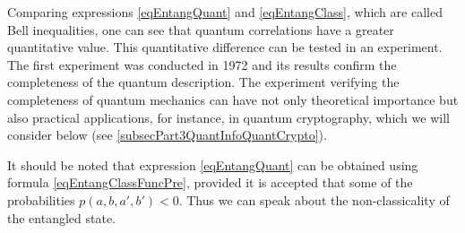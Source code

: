 Comparing expressions \eqref{eqEntangQuant} and \eqref{eqEntangClass},
which are called Bell inequalities,
one can see that quantum correlations have a greater quantitative
value. This quantitative difference can be tested in
an experiment. The first experiment was conducted in 1972
\cite{PhysRevLett.28.938} and its results confirm
the completeness of the quantum description. The experiment verifying the completeness of quantum
mechanics can have not only theoretical importance but also practical
applications, for instance, in quantum cryptography, which we will
consider below (see \ref{subsecPart3QuantInfoQuantCrypto}). 

It should be noted that expression \eqref{eqEntangQuant} can be
obtained using formula \eqref{eqEntangClassFuncPre}, provided
it is accepted that some of the probabilities
$p\left(a,b,a',b'\right) < 0$. Thus we can speak about
the non-classicality of the entangled state.  
